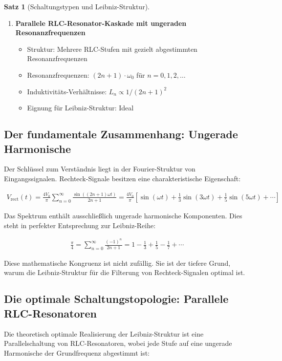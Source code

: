 \documentclass[a4paper,12pt,twoside]{report}
\theoremstyle{definition}
\newtheorem{satz}{Satz}
\begin{document}
\begin{satz}[Schaltungstypen und Leibniz-Struktur]
\begin{enumerate}
	\item \textbf{Parallele RLC-Resonator-Kaskade mit ungeraden Resonanzfrequenzen}
		\begin{itemize}
			\item Struktur: Mehrere RLC-Stufen mit gezielt abgestimmten Resonanzfrequenzen
			\item Resonanzfrequenzen: $(2n+1) \cdot \omega_0$ für $n = 0, 1, 2, \ldots$
			\item Induktivitäts-Verhältnisse: $L_n \propto 1/(2n+1)^2$
			\item Eignung für Leibniz-Struktur: Ideal
		\end{itemize}
\end{enumerate}
\end{satz}

\subsection{Der fundamentale Zusammenhang: Ungerade Harmonische}

Der Schlüssel zum Verständnis liegt in der Fourier-Struktur von Eingangssignalen. Rechteck-Signale besitzen eine charakteristische Eigenschaft:

\begin{align}
	V_{\text{rect}}(t) = \frac{4V_0}{\pi} \sum_{n=0}^{\infty} \frac{\sin((2n+1)\omega t)}{2n+1}
	= \frac{4V_0}{\pi} \left[ \sin(\omega t) + \frac{1}{3}\sin(3\omega t) + \frac{1}{5}\sin(5\omega t) + \cdots \right]
\end{align}

Das Spektrum enthält ausschließlich ungerade harmonische Komponenten. Dies steht in perfekter Entsprechung zur Leibniz-Reihe:

\begin{align}
	\frac{\pi}{4} = \sum_{n=0}^{\infty} \frac{(-1)^n}{2n+1} = 1 - \frac{1}{3} + \frac{1}{5} - \frac{1}{7} + \cdots
\end{align}

Diese mathematische Kongruenz ist nicht zufällig. Sie ist der tiefere Grund, warum die Leibniz-Struktur für die Filterung von Rechteck-Signalen optimal ist.

\subsection{Die optimale Schaltungstopologie: Parallele RLC-Resonatoren}

Die theoretisch optimale Realisierung der Leibniz-Struktur ist eine Parallelschaltung von RLC-Resonatoren, wobei jede Stufe auf eine ungerade Harmonische der Grundfrequenz abgestimmt ist:
\end{document}
